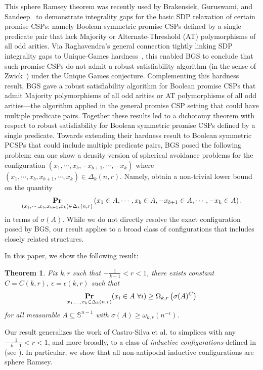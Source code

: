 \documentclass[11pt]{article}
\newtheorem{theorem}{Theorem}[section]
\renewcommand{\Pr}{\mathop{\bf Pr\/}}
\begin{document}
\smallskip
This sphere Ramsey theorem was recently used by Brakensiek, Guruswami, and Sandeep~\cite{brakensiek2023sdps} to demonstrate integrality gaps for the basic SDP relaxation of certain promise CSPs: namely Boolean symmetric promise CSPs defined by a single predicate pair that lack Majority or Alternate-Threshold (AT) polymorphisms of all odd arities. Via Raghavendra's general connection tightly linking SDP integrality gaps to Unique-Games hardness~\cite{raghavendra2008optimal}, this enabled BGS to conclude that such promise CSPs do not admit a robust satisfiability algorithm (in the sense of Zwick~\cite{zwick1998finding}) under the Unique Games conjecture. Complementing this hardness result, BGS gave a robust satisfiability algorithm for Boolean promise CSPs that admit Majority polymorphisms of all odd arities or AT polymorphisms of all odd arities---the algorithm applied in the general promise CSP setting that could have multiple predicate pairs. Together these results led to a dichotomy theorem with respect to robust satisfiability for Boolean symmetric promise CSPs defined by a single predicate. Towards extending their hardness result to Boolean symmetric PCSPs that could include multiple predicate pairs, BGS posed the following problem: can one show a density version of spherical avoidance problems for the configuration $(x_1,\cdots,x_b,-x_{b+1},\cdots, -x_k)$ where $(x_1,\cdots,x_b,x_{b+1},\cdots, x_k)\in\Delta_{k}(n,r)$. Namely, obtain a non-trivial lower bound on the quantity
$$\Pr_{(x_1,\cdots,x_b,x_{b+1},x_k)\in\Delta_{k}(n,r)}\left(x_1\in A,\cdots,x_b\in A,-x_{b+1}\in A,\cdots, -x_k\in A\right).$$
in terms of $\sigma(A)$. While we do not directly resolve the exact configuration posed by BGS, our result applies to a broad class of configurations that includes closely related structures.

\smallskip
In this paper, we show the following result:
\begin{theorem}
    Fix $k,r$ such that \( -\frac{1}{k-1} < r < 1 \), there exists constant \( C = C(k,r),\ \epsilon=\epsilon(k,r) \) such that
\[
\Pr_{x_1,\dots,x_k \in \Delta_k(n,r)}(x_i \in A\ \forall i) \geq \Omega_{k,r}\left(\sigma(A)^C\right)
\]
for all measurable \( A \subseteq \mathbb{S}^{n-1} \) with \( \sigma(A) \geq \omega_{k,r}(n^{-\epsilon}) \).
\end{theorem}

Our result generalizes the work of Castro-Silva et al. to simplices with any \( -\frac{1}{k-1} < r < 1 \), and more broadly, to a class of \emph{inductive configurations} defined in  (see ). In particular, we show that all non-antipodal inductive configurations are sphere Ramsey.
\end{document}
